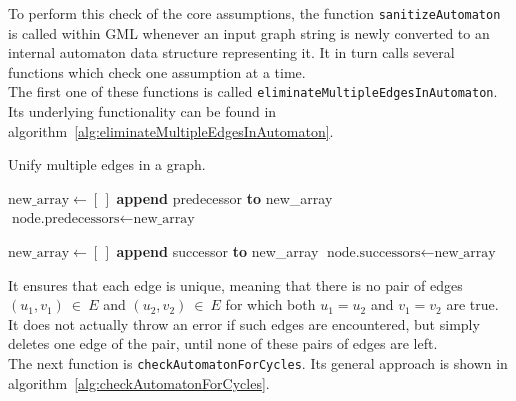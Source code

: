 \documentclass[a4paper,12pt,twoside,BCOR=10mm]{scrbook}
\begin{document}
To perform this check of the core assumptions, the function \texttt{sanitizeAutomaton} is called within GML
whenever an input graph string is newly converted to an internal automaton data structure representing it.
It in turn calls several functions which check one assumption at a time. \\
The first one of these functions is called \texttt{eliminateMultipleEdgesInAutomaton}.
Its underlying functionality can be found in algorithm~\ref{alg:eliminateMultipleEdgesInAutomaton}.
\begin{algorithm}
\caption[Unify multiple edges in a graph]{Unify multiple edges in a graph.}
\label{alg:eliminateMultipleEdgesInAutomaton}
\begin{algorithmic}[1]
		\State $ \textrm{new\_array} \gets [ \, ] $
				\State \textbf{append} predecessor \textbf{to} new\_array
			\EndIf
		\EndFor
		\State $ \textrm{node.predecessors} \gets \textrm{new\_array} $
	\EndIf

		\State $ \textrm{new\_array} \gets [ \, ] $
				\State \textbf{append} successor \textbf{to} new\_array
			\EndIf
		\EndFor
		\State $ \textrm{node.successors} \gets \textrm{new\_array} $
	\EndIf
\EndFor
\end{algorithmic}
\end{algorithm}
It ensures that each edge is unique, meaning that there is no pair of
edges $ (u_1, v_1) {\: \in \:} E $ and $ (u_2, v_2) {\: \in \:} E $ for which both $ u_1 = u_2 $ and $ v_1 = v_2 $ are true.
It does not actually throw an error if such edges are encountered, but simply deletes one edge of the pair, until none
of these pairs of edges are left. \\
The next function is \texttt{checkAutomatonForCycles}.
Its general approach is shown in algorithm~\ref{alg:checkAutomatonForCycles}.
\end{document}
